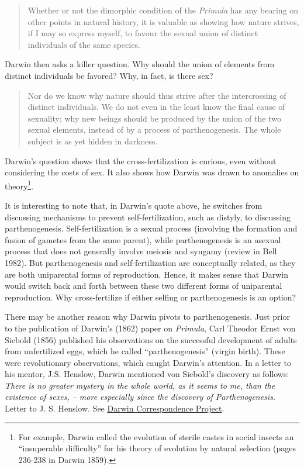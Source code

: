 \documentclass[
  letterpaper,
]{book}
\begin{document}
\begin{quote}
Whether or not the dimorphic condition of the \emph{Primula} has any
bearing on other points in natural history, it is valuable as showing
how nature strives, if I may so express myself, to favour the sexual
union of distinct individuals of the same species.
\end{quote}

Darwin then asks a killer question. Why should the union of elements
from distinct individuals be favored? Why, in fact, is there sex?

\begin{quote}
Nor do we know why nature should thus strive after the intercrossing of
distinct individuals. We do not even in the least know the final cause
of sexuality; why new beings should be produced by the union of the two
sexual elements, instead of by a process of parthenogenesis. The whole
subject is as yet hidden in darkness.
\end{quote}

Darwin's question shows that the cross-fertilization is curious, even
without considering the costs of sex. It also shows how Darwin was drawn
to anomalies on theory\footnote{For example, Darwin called the evolution
  of sterile castes in social insects an ``insuperable difficulty'' for
  his theory of evolution by natural selection (pages 236-238 in Darwin
  1859).}.

It is interesting to note that, in Darwin's quote above, he switches
from discussing mechanisms to prevent self-fertilization, such as
distyly, to discussing parthenogenesis. Self-fertilization is a sexual
process (involving the formation and fusion of gametes from the same
parent), while parthenogenesis is an asexual process that does not
generally involve meiosis and syngamy (review in Bell 1982). But
parthenogenesis and self-fertilization are conceptually related, as they
are both uniparental forms of reproduction. Hence, it makes sense that
Darwin would switch back and forth between these two different forms of
uniparental reproduction. Why cross-fertilize if either selfing or
parthenogenesis is an option?

There may be another reason why Darwin pivots to parthenogenesis. Just
prior to the publication of Darwin's (1862) paper on \emph{Primula},
Carl Theodor Ernst von Siebold (1856) published his observations on the
successful development of adults from unfertilized eggs, which he called
``parthenogenesis'' (virgin birth). These were revolutionary
observations, which caught Darwin's attention. In a letter to his
mentor, J.S. Henslow, Darwin mentioned von Siebold's discovery as
follows: \emph{There is no greater mystery in the whole world, as it
seems to me, than the existence of sexes, -- more especially since the
discovery of Parthenogenesis}. Letter to J. S. Henslow. See
\href{https://www.darwinproject.ac.uk/letter/DCP-LETT-2869.xml}{Darwin
Correspondence Project}.
\end{document}
